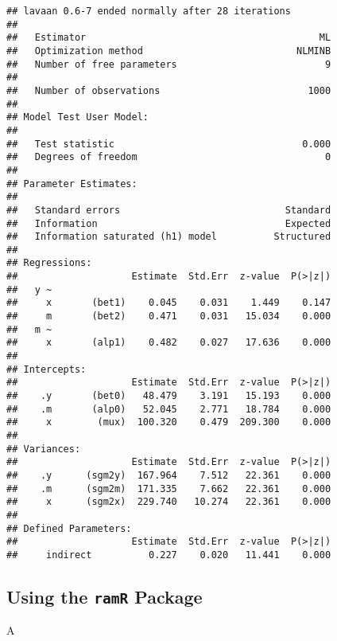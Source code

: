 \documentclass[
]{book}
\newenvironment{Shaded}{\begin{snugshade}}{\end{snugshade}}
\newcommand{\NormalTok}[1]{#1}
\theoremstyle{definition}
\theoremstyle{definition}
\theoremstyle{definition}
\theoremstyle{remark}
\begin{document}
\begin{verbatim}
## lavaan 0.6-7 ended normally after 28 iterations
## 
##   Estimator                                         ML
##   Optimization method                           NLMINB
##   Number of free parameters                          9
##                                                       
##   Number of observations                          1000
##                                                       
## Model Test User Model:
##                                                       
##   Test statistic                                 0.000
##   Degrees of freedom                                 0
## 
## Parameter Estimates:
## 
##   Standard errors                             Standard
##   Information                                 Expected
##   Information saturated (h1) model          Structured
## 
## Regressions:
##                    Estimate  Std.Err  z-value  P(>|z|)
##   y ~                                                 
##     x       (bet1)    0.045    0.031    1.449    0.147
##     m       (bet2)    0.471    0.031   15.034    0.000
##   m ~                                                 
##     x       (alp1)    0.482    0.027   17.636    0.000
## 
## Intercepts:
##                    Estimate  Std.Err  z-value  P(>|z|)
##    .y       (bet0)   48.479    3.191   15.193    0.000
##    .m       (alp0)   52.045    2.771   18.784    0.000
##     x        (mux)  100.320    0.479  209.300    0.000
## 
## Variances:
##                    Estimate  Std.Err  z-value  P(>|z|)
##    .y      (sgm2y)  167.964    7.512   22.361    0.000
##    .m      (sgm2m)  171.335    7.662   22.361    0.000
##     x      (sgm2x)  229.740   10.274   22.361    0.000
## 
## Defined Parameters:
##                    Estimate  Std.Err  z-value  P(>|z|)
##     indirect          0.227    0.020   11.441    0.000
\end{verbatim}

\hypertarget{using-the-ramr-package-5}{%
\subsection{\texorpdfstring{Using the \texttt{ramR} Package}{Using the ramR Package}}\label{using-the-ramr-package-5}}

\begin{Shaded}
\begin{Highlighting}[]
\NormalTok{A}
\end{Highlighting}
\end{Shaded}
\end{document}
